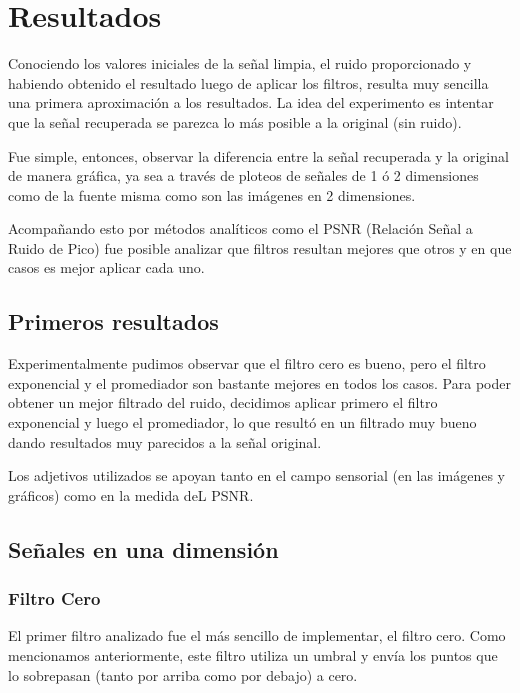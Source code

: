 \section{Resultados}

Conociendo los valores iniciales de la se\~nal limpia, el ruido proporcionado y
habiendo obtenido el resultado luego de aplicar los filtros, resulta muy
sencilla una primera aproximaci\'on a los resultados. La idea del experimento es
intentar que la se\~nal recuperada se parezca lo m\'as posible a la original
(sin ruido).

Fue simple, entonces, observar la diferencia entre la se\~nal recuperada y
la original de manera gr\'afica, ya sea a trav\'es de ploteos de se\~nales de 1
\'o 2 dimensiones como de la fuente misma como son las im\'agenes en 2
dimensiones.

Acompa\~nando esto por m\'etodos anal\'iticos como el PSNR (Relaci\'on Se\~nal a
Ruido de Pico) fue posible analizar que filtros resultan mejores que otros y en
que casos es mejor aplicar cada uno.

\subsection{Primeros resultados}

Experimentalmente pudimos observar que el filtro cero es bueno, pero el filtro 
exponencial y el promediador son bastante mejores en todos los casos. 
Para poder obtener un mejor filtrado del ruido, decidimos aplicar primero el 
filtro exponencial y luego el promediador, lo que result\'o en un filtrado muy 
bueno dando resultados muy parecidos a la se\~nal original. 

Los adjetivos utilizados se apoyan tanto en el campo sensorial (en las
im\'agenes y gr\'aficos) como en la medida deL PSNR. 

\subsection{Se\~nales en una dimensi\'on}

\subsubsection{Filtro Cero}

El primer filtro analizado fue el m\'as sencillo de implementar, el filtro cero.
Como mencionamos anteriormente, este filtro utiliza un umbral y env\'ia los
puntos que lo sobrepasan (tanto por arriba como por debajo) a cero.

